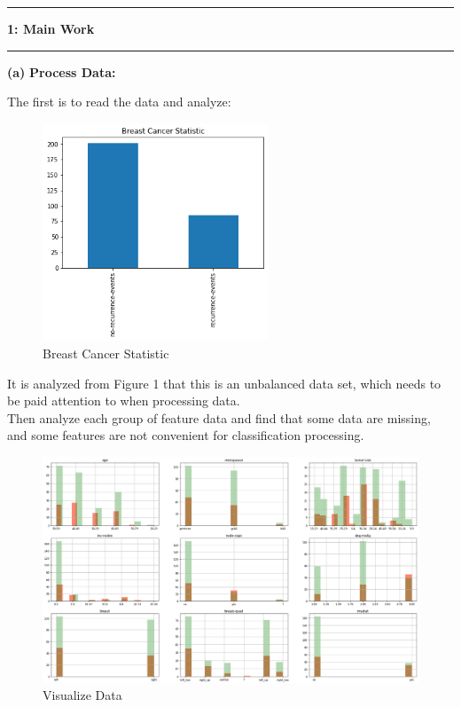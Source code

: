 \documentclass[11pt]{article}
\newcommand\question[2]{\vspace{.25in}\hrule\textbf{#1: #2}\vspace{.5em}\hrule\vspace{.10in}}
\renewcommand\part[1]{\vspace{.10in}\textbf{(#1)}}
\newcommand\pd{\vspace{.10in}\textbf{Process Data: }}
\begin{document}
\raggedright
\newcommand\NAME{Yao Xiao}  %
\newcommand\ANDREWID{2019180015}     %
\newcommand\HWNUM{}              %


\question{1}{Main Work} 

\part{a} \pd

The first is to read the data and analyze:

\begin{figure}[H]
    \centering
    \includegraphics[width=0.6\textwidth]{Fig1}
    \caption{Breast Cancer Statistic}
\end{figure}

It is analyzed from Figure 1 that this is an unbalanced data set, which needs to be paid attention to when processing data.\\
Then analyze each group of feature data and find that some data are missing, and some features are not convenient for classification processing.

\begin{figure}[H]
    \centering
    \includegraphics[width=1\textwidth]{Fig2}
    \caption{Visualize Data}
\end{figure}
\end{document}
